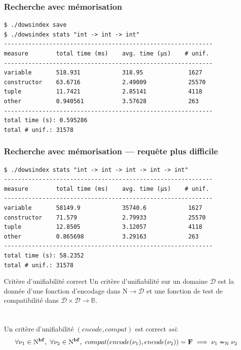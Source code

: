 \documentclass[serif]{beamer}
\newcommand{\ssi}{\textit{ssi}\xspace}
\newcommand{\N}{\mathrm{N}}
\begin{document}

\begin{frame}[fragile=singleslide]\frametitle{Recherche avec mémorisation}
\footnotesize
\begin{verbatim}
$ ./dowsindex save
$ ./dowsindex stats "int -> int -> int"
------------------------------------------------------------
measure        total time (ms)    avg. time (µs)    # unif.
------------------------------------------------------------
variable       518.931            318.95             1627
constructor    63.6716            2.49009            25570
tuple          11.7421            2.85141            4118
other          0.940561           3.57628            263
------------------------------------------------------------
total time (s): 0.595286
total # unif.: 31578
\end{verbatim}
\end{frame}


\begin{frame}[fragile=singleslide]\frametitle{Recherche avec mémorisation — requête plus difficile}
\footnotesize
\begin{verbatim}
$ ./dowsindex stats "int -> int -> int -> int -> int"
------------------------------------------------------------
measure        total time (ms)    avg. time (µs)    # unif.
------------------------------------------------------------
variable       58149.9            35740.6            1627
constructor    71.579             2.79933            25570
tuple          12.8505            3.12057            4118
other          0.865698           3.29163            263
------------------------------------------------------------
total time (s): 58.2352
total # unif.: 31578
\end{verbatim}
\end{frame}


\begin{frame}{Critère d'unifiabilité correct}
\small
Un critère d'unifiabilité sur un domaine $\mathscr{D}$ est la donnée d'une fonction d'encodage dans $\N \rightarrow \mathscr{D}$ et une fonction de test de compatibilité dans $\mathscr{D} \times \mathscr{D} \rightarrow \mathbb{B}$.
\\~\\~\\
Un critère d'unifiabilité $(encode, compat)$ est correct \ssi :
\[ \forall \nu_1 \in \N^{\bold{bf}},\ \forall \nu_2 \in \N^{\bold{bf}},\ compat (encode (\nu_1), encode (\nu_2)) = \bold{F} \implies \nu_1 \nsim_\N \nu_2 \]
\end{frame}
\end{document}
